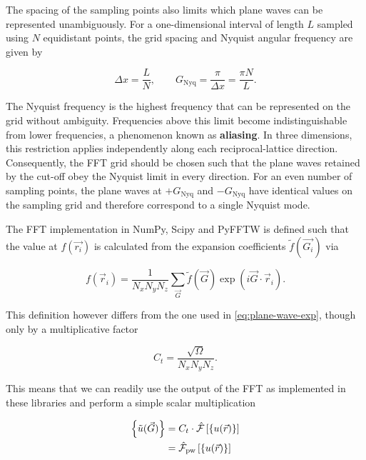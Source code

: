 The spacing of the sampling points also limits which plane waves can be represented unambiguously. For a one-dimensional interval of length $L$ sampled using $N$ equidistant points, the grid spacing and Nyquist angular frequency are given by

\begin{equation}
    \Delta x = \frac{L}{N}, \qquad G_{\textrm{Nyq}} = \frac{\pi}{\Delta x} = \frac{\pi N}{L}.
\end{equation}

The Nyquist frequency is the highest frequency that can be represented on the grid without ambiguity. Frequencies above this limit become indistinguishable from lower frequencies, a phenomenon known as \textbf{aliasing}. In three dimensions, this restriction applies independently along each reciprocal-lattice direction. Consequently, the FFT grid should be chosen such that the plane waves retained by the cut-off obey the Nyquist limit in every direction. For an even number of sampling points, the plane waves at $+G_{\textrm{Nyq}}$ and $-G_{\textrm{Nyq}}$ have identical values on the sampling grid and therefore correspond to a single Nyquist mode.

The FFT implementation in NumPy, Scipy and PyFFTW is defined such that the value at $f(\vec{r_{i}})$ is calculated from the expansion coefficients $\tilde{f}(\vec{G_{i}})$ via

\begin{equation}
    f(\vec{r}_{i}) = \frac{1}{N_{x}N_{y}N_{z}} \sum_{\vec{G}} \tilde{f}(\vec{G}) \exp \left(i \vec{G} \cdot \vec{r}_{i} \right).
\end{equation}

This definition however differs from the one used in \cref{eq:plane-wave-exp}, though only by a multiplicative factor

\begin{equation}
    C_{t} = \frac{\sqrt{\Omega}}{N_{x}N_{y}N_{z}}.
    \label{eq:ct}
\end{equation}

This means that we can readily use the output of the FFT as implemented in these libraries and perform a simple scalar multiplication

\begin{align}
    \left\{\tilde{u}(\vec{G})\right\} &= C_{t} \cdot \hat{\mathcal{F}}\left[\left\{ u(\vec{r}) \right\}\right] \\
    &= \hat{\mathcal{F}}_{\text{pw}}\left[\left\{ u(\vec{r}) \right\}\right]
\end{align}

